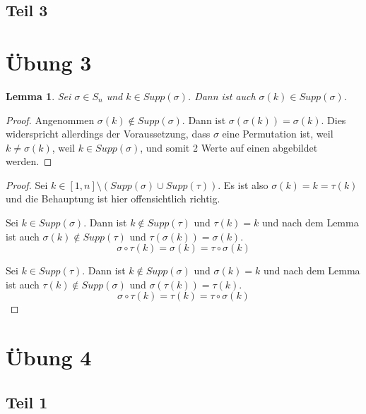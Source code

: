 \documentclass[10pt,a4paper]{article}
\begin{document}
\subsection*{Teil 3}

\section*{Übung 3}

\newtheorem*{lemma}{Lemma}

\begin{lemma}
Sei $\sigma \in S_{n}$ und $k \in Supp(\sigma)$.
Dann ist auch $\sigma(k) \in Supp(\sigma)$.
\end{lemma}

\begin{proof}
Angenommen $\sigma(k) \notin Supp(\sigma)$.
Dann ist $\sigma(\sigma(k)) = \sigma(k)$.
Dies widerspricht allerdings der Voraussetzung, dass $\sigma$ eine Permutation ist, weil $k \ne \sigma(k)$, weil $k \in Supp(\sigma)$, und somit 2 Werte auf einen abgebildet werden.
\end{proof}

\begin{proof}
Sei $k \in [1, n] \setminus (Supp(\sigma) \cup Supp(\tau))$.
Es ist also $\sigma(k) = k = \tau(k)$ und die Behauptung ist hier offensichtlich richtig.

Sei $k \in Supp(\sigma)$.
Dann ist $k \notin Supp(\tau)$ und $\tau(k) = k$ und nach dem Lemma ist auch $\sigma(k) \notin Supp(\tau)$ und $\tau(\sigma(k)) = \sigma(k)$.
\begin{equation}
\sigma \circ \tau(k) = \sigma(k) = \tau \circ \sigma(k)
\end{equation}

Sei $k \in Supp(\tau)$.
Dann ist $k \notin Supp(\sigma)$ und $\sigma(k) = k$ und nach dem Lemma ist auch $\tau(k) \notin Supp(\sigma)$ und $\sigma(\tau(k)) = \tau(k)$.
\begin{equation}
\sigma \circ \tau(k) = \tau(k) = \tau \circ \sigma(k)
\end{equation}
\end{proof}

\section*{Übung 4}

\subsection*{Teil 1}
\end{document}
